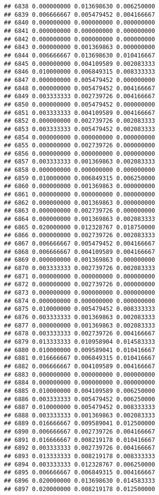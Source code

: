 \documentclass[
]{article}
\begin{document}
\begin{verbatim}
## 6838 0.000000000 0.013698630 0.006250000
## 6839 0.006666667 0.005479452 0.004166667
## 6840 0.000000000 0.000000000 0.000000000
## 6841 0.000000000 0.000000000 0.000000000
## 6842 0.000000000 0.000000000 0.000000000
## 6843 0.000000000 0.001369863 0.000000000
## 6844 0.006666667 0.013698630 0.010416667
## 6845 0.000000000 0.004109589 0.002083333
## 6846 0.010000000 0.006849315 0.008333333
## 6847 0.000000000 0.005479452 0.000000000
## 6848 0.000000000 0.005479452 0.004166667
## 6849 0.003333333 0.002739726 0.004166667
## 6850 0.000000000 0.005479452 0.000000000
## 6851 0.003333333 0.004109589 0.004166667
## 6852 0.000000000 0.002739726 0.002083333
## 6853 0.003333333 0.005479452 0.002083333
## 6854 0.000000000 0.000000000 0.000000000
## 6855 0.000000000 0.002739726 0.000000000
## 6856 0.000000000 0.000000000 0.000000000
## 6857 0.003333333 0.001369863 0.002083333
## 6858 0.000000000 0.000000000 0.000000000
## 6859 0.010000000 0.006849315 0.006250000
## 6860 0.000000000 0.001369863 0.000000000
## 6861 0.000000000 0.000000000 0.000000000
## 6862 0.000000000 0.001369863 0.000000000
## 6863 0.000000000 0.002739726 0.000000000
## 6864 0.000000000 0.001369863 0.002083333
## 6865 0.020000000 0.012328767 0.018750000
## 6866 0.000000000 0.002739726 0.002083333
## 6867 0.006666667 0.005479452 0.004166667
## 6868 0.006666667 0.004109589 0.004166667
## 6869 0.000000000 0.001369863 0.000000000
## 6870 0.003333333 0.002739726 0.002083333
## 6871 0.000000000 0.000000000 0.000000000
## 6872 0.000000000 0.002739726 0.000000000
## 6873 0.000000000 0.000000000 0.000000000
## 6874 0.000000000 0.000000000 0.000000000
## 6875 0.010000000 0.005479452 0.008333333
## 6876 0.003333333 0.001369863 0.002083333
## 6877 0.000000000 0.001369863 0.002083333
## 6878 0.003333333 0.002739726 0.004166667
## 6879 0.013333333 0.010958904 0.014583333
## 6880 0.010000000 0.009589041 0.010416667
## 6881 0.016666667 0.006849315 0.010416667
## 6882 0.006666667 0.004109589 0.004166667
## 6883 0.000000000 0.000000000 0.000000000
## 6884 0.000000000 0.000000000 0.000000000
## 6885 0.010000000 0.004109589 0.006250000
## 6886 0.003333333 0.005479452 0.006250000
## 6887 0.010000000 0.005479452 0.008333333
## 6888 0.003333333 0.001369863 0.002083333
## 6889 0.016666667 0.009589041 0.012500000
## 6890 0.006666667 0.002739726 0.004166667
## 6891 0.016666667 0.008219178 0.010416667
## 6892 0.003333333 0.002739726 0.004166667
## 6893 0.013333333 0.008219178 0.008333333
## 6894 0.003333333 0.012328767 0.006250000
## 6895 0.006666667 0.006849315 0.004166667
## 6896 0.020000000 0.013698630 0.014583333
## 6897 0.020000000 0.008219178 0.012500000

\end{verbatim}
\end{document}
